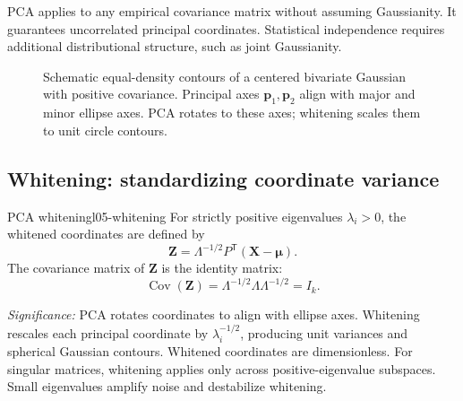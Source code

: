 \begin{remark}
PCA applies to any empirical covariance matrix without assuming Gaussianity. It guarantees uncorrelated principal coordinates. Statistical independence requires additional distributional structure, such as joint Gaussianity.
\end{remark}

\begin{figure}[htbp]
\centering
{}
\caption{Schematic equal-density contours of a centered bivariate Gaussian with positive covariance. Principal axes $\mathbf p_1, \mathbf p_2$ align with major and minor ellipse axes. PCA rotates to these axes; whitening scales them to unit circle contours.}
\label{fig:l05-pca-axes}
\end{figure}

\subsection{Whitening: standardizing coordinate variance}
\label{subsec:l05-whitening}
\begin{definition}{PCA whitening}{l05-whitening}
For strictly positive eigenvalues $\lambda_i>0$, the whitened coordinates are defined by
\begin{equation}
\mathbf Z=\Lambda^{-1/2}P^{\mathsf T}(\mathbf X-\boldsymbol\mu).
\label{eq:l05-whitening}
\end{equation}
The covariance matrix of $\mathbf Z$ is the identity matrix:
\begin{equation}
\operatorname{Cov}(\mathbf Z)
=\Lambda^{-1/2}\Lambda\Lambda^{-1/2}=I_k.
\label{eq:l05-whitened-cov}
\end{equation}
\end{definition}
\textit{Significance:} PCA rotates coordinates to align with ellipse axes. Whitening rescales each principal coordinate by $\lambda_i^{-1/2}$, producing unit variances and spherical Gaussian contours. Whitened coordinates are dimensionless. For singular matrices, whitening applies only across positive-eigenvalue subspaces. Small eigenvalues amplify noise and destabilize whitening.

